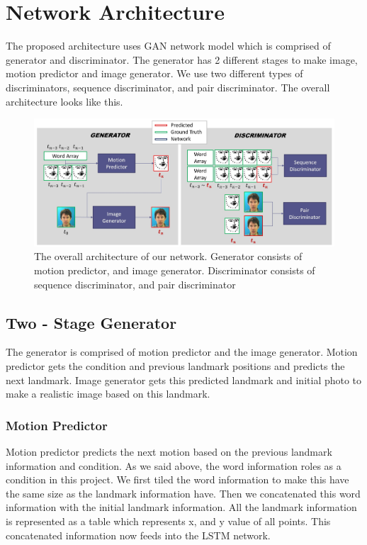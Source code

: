 \documentclass[10pt,twocolumn,letterpaper]{article}
\begin{document}
\section{Network Architecture}
The proposed architecture uses GAN network model which is comprised of generator and discriminator. The generator has 2 different stages to make image, motion predictor and image generator. We use two different types of discriminators, sequence discriminator, and pair discriminator. The overall architecture looks like this.
\begin{figure}
\begin{center}
\includegraphics [scale=0.3] {images/network.JPG}
\end{center}
 \caption{The overall architecture of our network.  Generator consists of motion predictor, and image generator. Discriminator consists of sequence discriminator, and pair discriminator}
\label{fig:short}
\end{figure}


\subsection{Two - Stage Generator}
The generator is comprised of motion predictor and the image generator. Motion predictor gets the condition and previous landmark positions and predicts the next landmark. Image generator gets this predicted landmark and initial photo to make a realistic image based on this landmark.

\subsubsection{Motion Predictor}
Motion predictor predicts the next motion based on the previous landmark information and condition. As we said above, the word information roles as a condition in this project. We first tiled the word information to make this have the same size as the landmark information have. Then we concatenated this word information with the initial landmark information. All the landmark information is represented as a table which represents x, and y value of all points. This concatenated information now feeds into the LSTM network.
\end{document}
